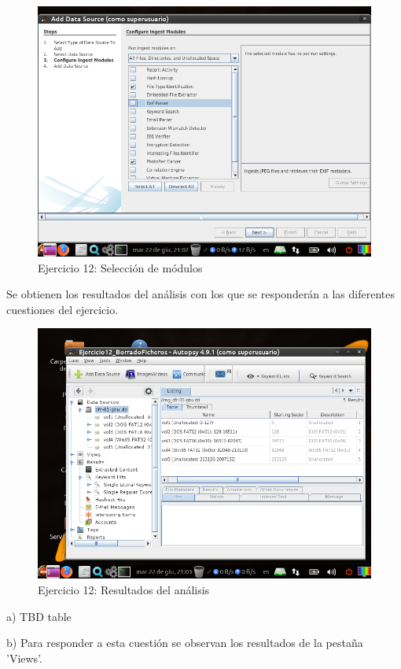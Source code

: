 \documentclass[11pt]{article}
\begin{document}
\begin{figure}[H]
    \caption{Ejercicio 12: Selección de módulos}
    \centering
    \includegraphics[scale=0.7]{e12-4.png}
\end{figure}

Se obtienen los resultados del análisis con los que se responderán a las diferentes cuestiones del ejercicio.

\begin{figure}[H]
    \caption{Ejercicio 12: Resultados del análisis}
    \centering
    \includegraphics[scale=0.7]{e12-5.png}
\end{figure}

a) TBD table

b) Para responder a esta cuestión se observan los resultados de la pestaña 'Views'.
\end{document}
